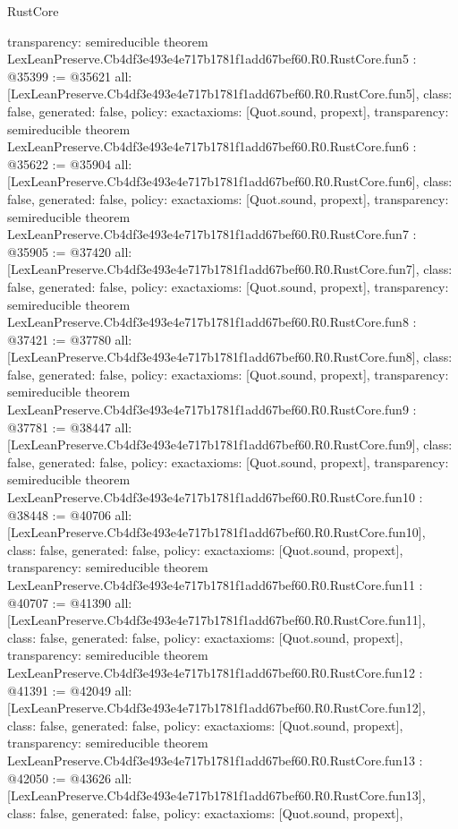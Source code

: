 \begin{lexlean}{RustCore}
\begin{coremodule}
{  transparency: semireducible
}
theorem LexLeanPreserve.Cb4df3e493e4e717b1781f1add67bef60.R0.RustCore.fun5 : @35399 := @35621 {
  all: [LexLeanPreserve.Cb4df3e493e4e717b1781f1add67bef60.R0.RustCore.fun5],
  class: false,
  generated: false,
  policy: exact{axioms: [Quot.sound, propext]},
  transparency: semireducible
}
theorem LexLeanPreserve.Cb4df3e493e4e717b1781f1add67bef60.R0.RustCore.fun6 : @35622 := @35904 {
  all: [LexLeanPreserve.Cb4df3e493e4e717b1781f1add67bef60.R0.RustCore.fun6],
  class: false,
  generated: false,
  policy: exact{axioms: [Quot.sound, propext]},
  transparency: semireducible
}
theorem LexLeanPreserve.Cb4df3e493e4e717b1781f1add67bef60.R0.RustCore.fun7 : @35905 := @37420 {
  all: [LexLeanPreserve.Cb4df3e493e4e717b1781f1add67bef60.R0.RustCore.fun7],
  class: false,
  generated: false,
  policy: exact{axioms: [Quot.sound, propext]},
  transparency: semireducible
}
theorem LexLeanPreserve.Cb4df3e493e4e717b1781f1add67bef60.R0.RustCore.fun8 : @37421 := @37780 {
  all: [LexLeanPreserve.Cb4df3e493e4e717b1781f1add67bef60.R0.RustCore.fun8],
  class: false,
  generated: false,
  policy: exact{axioms: [Quot.sound, propext]},
  transparency: semireducible
}
theorem LexLeanPreserve.Cb4df3e493e4e717b1781f1add67bef60.R0.RustCore.fun9 : @37781 := @38447 {
  all: [LexLeanPreserve.Cb4df3e493e4e717b1781f1add67bef60.R0.RustCore.fun9],
  class: false,
  generated: false,
  policy: exact{axioms: [Quot.sound, propext]},
  transparency: semireducible
}
theorem LexLeanPreserve.Cb4df3e493e4e717b1781f1add67bef60.R0.RustCore.fun10 : @38448 := @40706 {
  all: [LexLeanPreserve.Cb4df3e493e4e717b1781f1add67bef60.R0.RustCore.fun10],
  class: false,
  generated: false,
  policy: exact{axioms: [Quot.sound, propext]},
  transparency: semireducible
}
theorem LexLeanPreserve.Cb4df3e493e4e717b1781f1add67bef60.R0.RustCore.fun11 : @40707 := @41390 {
  all: [LexLeanPreserve.Cb4df3e493e4e717b1781f1add67bef60.R0.RustCore.fun11],
  class: false,
  generated: false,
  policy: exact{axioms: [Quot.sound, propext]},
  transparency: semireducible
}
theorem LexLeanPreserve.Cb4df3e493e4e717b1781f1add67bef60.R0.RustCore.fun12 : @41391 := @42049 {
  all: [LexLeanPreserve.Cb4df3e493e4e717b1781f1add67bef60.R0.RustCore.fun12],
  class: false,
  generated: false,
  policy: exact{axioms: [Quot.sound, propext]},
  transparency: semireducible
}
theorem LexLeanPreserve.Cb4df3e493e4e717b1781f1add67bef60.R0.RustCore.fun13 : @42050 := @43626 {
  all: [LexLeanPreserve.Cb4df3e493e4e717b1781f1add67bef60.R0.RustCore.fun13],
  class: false,
  generated: false,
  policy: exact{axioms: [Quot.sound, propext]},
}
\end{coremodule}
\end{lexlean}
